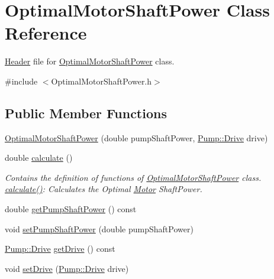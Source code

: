\hypertarget{class_optimal_motor_shaft_power}{}\section{Optimal\+Motor\+Shaft\+Power Class Reference}
\label{class_optimal_motor_shaft_power}


\hyperlink{class_header}{Header} file for \hyperlink{class_optimal_motor_shaft_power}{Optimal\+Motor\+Shaft\+Power} class.  




{\ttfamily \#include $<$Optimal\+Motor\+Shaft\+Power.\+h$>$}

\subsection*{Public Member Functions}
\begin{DoxyCompactItemize}
\item 
\hyperlink{class_optimal_motor_shaft_power_a5b793114a451ef9fe7a29f9db9f44bb6}{Optimal\+Motor\+Shaft\+Power} (double pump\+Shaft\+Power, \hyperlink{class_pump_a32bf0ade131a11bb3b3fb374f638e983}{Pump\+::\+Drive} drive)
\item 
double \hyperlink{class_optimal_motor_shaft_power_a34d47733928ae518fa6f3d08b7d8a12e}{calculate} ()
\begin{DoxyCompactList}\small\item\em Contains the definition of functions of \hyperlink{class_optimal_motor_shaft_power}{Optimal\+Motor\+Shaft\+Power} class. \hyperlink{class_optimal_motor_shaft_power_a34d47733928ae518fa6f3d08b7d8a12e}{calculate()}\+: Calculates the Optimal \hyperlink{class_motor}{Motor} Shaft\+Power. \end{DoxyCompactList}\item 
double \hyperlink{class_optimal_motor_shaft_power_aca7bb632c659ecf2ebf3cb9fdb23626f}{get\+Pump\+Shaft\+Power} () const
\item 
void \hyperlink{class_optimal_motor_shaft_power_ab2d80927fbaa62705359700b2a8f2f26}{set\+Pump\+Shaft\+Power} (double pump\+Shaft\+Power)
\item 
\hyperlink{class_pump_a32bf0ade131a11bb3b3fb374f638e983}{Pump\+::\+Drive} \hyperlink{class_optimal_motor_shaft_power_a23e1045bb2e3ee62205276cbbebbc3ad}{get\+Drive} () const
\item 
void \hyperlink{class_optimal_motor_shaft_power_abd88cbdcba70dbb194a8f957b4467fc7}{set\+Drive} (\hyperlink{class_pump_a32bf0ade131a11bb3b3fb374f638e983}{Pump\+::\+Drive} drive)
\end{DoxyCompactItemize}


